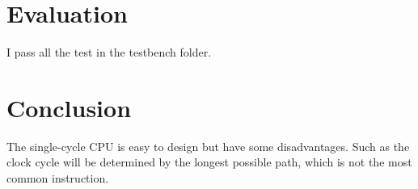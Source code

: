 \documentclass[12pt,a4paper]{article}
\begin{document}
\section{Evaluation}

I pass all the test in the testbench folder.





\section{Conclusion}

The single-cycle CPU is easy to design but have some disadvantages.
Such as the clock cycle will be determined by the longest possible path, which is not the most common instruction. 
\end{document}
